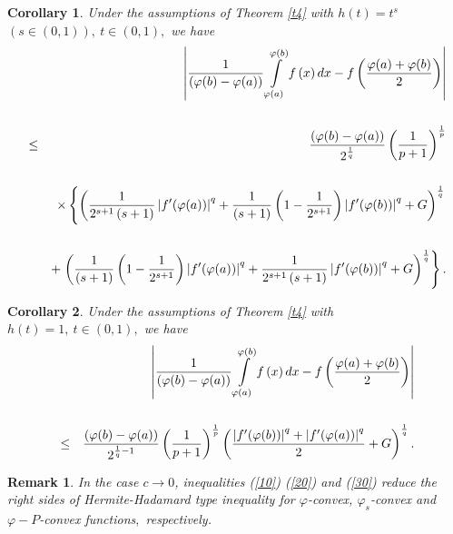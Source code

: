 \documentclass{amsart}
\theoremstyle{plain}
\newtheorem{corollary}{Corollary}
\newtheorem{remark}{Remark}
\numberwithin{equation}{section}
\begin{document}
\begin{corollary}
Under the assumptions of Theorem \ref{t4} with $h(t)=t^{s}$ $(s\in \left(
0,1\right) ),\ t\in \left( 0,1\right) ,$ we have\begin{eqnarray}
&&\left\vert \frac{1}{(\varphi (b)-\varphi (a))}\int\limits_{\varphi
(a)}^{\varphi (b)}f\left( x\right) dx-f\left( \frac{\varphi (a)+\varphi (b)}{2}\right) \right\vert   \notag \\
&&  \notag \\
&\leq &\dfrac{(\varphi (b)-\varphi (a))}{2^{\frac{1}{q}}}\left( \frac{1}{p+1}\right) ^{\frac{1}{p}}  \label{20} \\
&&  \notag \\
&&\times \left\{ \left( \frac{1}{2^{s+1}\left( s+1\right) }\left\vert
f^{\prime }(\varphi (a))\right\vert ^{q}+\frac{1}{\left( s+1\right) }\left(
1-\frac{1}{2^{s+1}}\right) \left\vert f^{\prime }(\varphi (b))\right\vert
^{q}+G\right) ^{\frac{1}{q}}\right.   \notag \\
&&  \notag \\
&&+\left. \left( \frac{1}{\left( s+1\right) }\left( 1-\frac{1}{2^{s+1}}\right) \left\vert f^{\prime }(\varphi (a))\right\vert ^{q}+\frac{1}{2^{s+1}\left( s+1\right) }\left\vert f^{\prime }(\varphi (b))\right\vert
^{q}+G\right) ^{\frac{1}{q}}\right\} .  \notag
\end{eqnarray}
\end{corollary}

\begin{corollary}
Under the assumptions of Theorem \ref{t4} with $h(t)=1,\ t\in \left(
0,1\right) ,$ we have\begin{eqnarray}
&&\left\vert \frac{1}{(\varphi (b)-\varphi (a))}\int\limits_{\varphi
(a)}^{\varphi (b)}f\left( x\right) dx-f\left( \frac{\varphi (a)+\varphi (b)}{2}\right) \right\vert   \notag \\
&&  \label{30} \\
&\leq &\dfrac{(\varphi (b)-\varphi (a))}{2^{\frac{1}{q}-1}}\left( \frac{1}{p+1}\right) ^{\frac{1}{p}}\left( \frac{\left\vert f^{\prime }(\varphi
(b))\right\vert ^{q}+\left\vert f^{\prime }(\varphi (a))\right\vert ^{q}}{2}+G\right) ^{\frac{1}{q}}.  \notag
\end{eqnarray}
\end{corollary}

\begin{remark}
In the case $c\rightarrow 0$, inequalities (\ref{10}) (\ref{20}) and (\ref{30}) reduce the right sides of Hermite-Hadamard type inequality for $\varphi $-convex, $\varphi _{s}$-convex and $\varphi -P$-convex functions$,$
respectively.
\end{remark}
\end{document}
